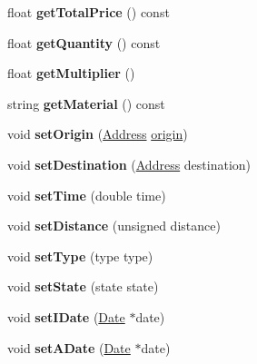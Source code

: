 \begin{DoxyCompactItemize}
float {\bfseries get\+Total\+Price} () const
\item 
\mbox{\label{class_service_aceff76eb1aba00c9c74eb98d56771a6a}} 
float {\bfseries get\+Quantity} () const
\item 
\mbox{\label{class_service_a924ea5df81fa28e96b5ef02bad0d6d7f}} 
float {\bfseries get\+Multiplier} ()
\item 
\mbox{\label{class_service_a92be216e9c710b28bc4046353884b3e2}} 
string {\bfseries get\+Material} () const
\item 
\mbox{\label{class_service_af3f248b1ecea5fd3fb0da198bfdbc7d5}} 
void {\bfseries set\+Origin} (\hyperlink{class_address}{Address} \hyperlink{class_service_a4abd0a104d97e5bdb8e8ca93bab31ce7}{origin})
\item 
\mbox{\label{class_service_a1c2082379deaf672919165e540afcab2}} 
void {\bfseries set\+Destination} (\hyperlink{class_address}{Address} destination)
\item 
\mbox{\label{class_service_aed76805ea044b29f0dafe65a7d39f2dc}} 
void {\bfseries set\+Time} (double time)
\item 
\mbox{\label{class_service_a6349774a4ab8afffe88dc51025690650}} 
void {\bfseries set\+Distance} (unsigned distance)
\item 
\mbox{\label{class_service_af26945add8ad6504432fa0c62c8c2769}} 
void {\bfseries set\+Type} (type type)
\item 
\mbox{\label{class_service_a7aa57d557be113ce2025843cb1046137}} 
void {\bfseries set\+State} (state state)
\item 
\mbox{\label{class_service_ac4635d11b13279a4ef84b1c6378639d4}} 
void {\bfseries set\+I\+Date} (\hyperlink{class_date}{Date} $\ast$date)
\item 
\mbox{\label{class_service_a80210953169ca04d454db8be48694187}} 
void {\bfseries set\+A\+Date} (\hyperlink{class_date}{Date} $\ast$date)
\item 

\end{DoxyCompactItemize}
